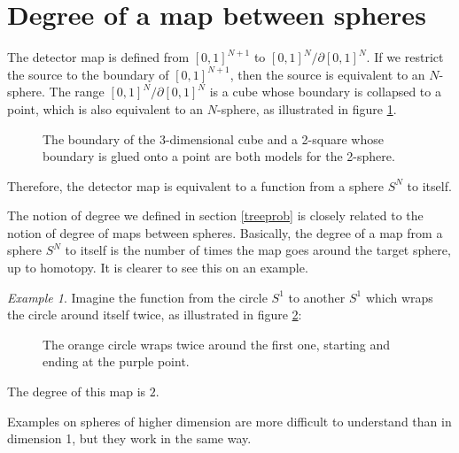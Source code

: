 \documentclass[12pt]{amsart}
\theoremstyle{plain}
\theoremstyle{definition}
\theoremstyle{remark}
\newtheorem{exemple}[teo]{Example}
\begin{document}
\section{Degree of a map between spheres}
The detector map is defined from $[0,1]^{N+1}$ to $[0,1]^N/\partial [0,1]^N$.
If we restrict the source to the boundary of $[0,1]^{N+1}$, then the source is equivalent to an $N$-sphere.
The range $[0,1]^N/\partial [0,1]^N$ is a cube whose boundary is collapsed to a point, 
which is also equivalent to an $N$-sphere, as illustrated in figure \ref{sphere}.
\begin{figure}
  \def\svgwidth{0.4\hsize}
  
  \caption{The boundary of the 3-dimensional cube and a 2-square whose boundary is glued onto a point 
  are both models for the 2-sphere.}
  \label{sphere}
\end{figure}
Therefore, the detector map is equivalent to a function from a sphere $S^N$ to itself.

The notion of degree we defined in section \ref{treeprob} is closely related 
to the notion of degree of maps between spheres.
Basically, the degree of a map from a sphere $S^N$ to itself is the number of times 
the map goes around the target sphere, up to homotopy.
It is clearer to see this on an example.
\begin{exemple}
  Imagine the function from the circle $S^1$ to another $S^1$ which wraps the circle around itself twice,
  as illustrated in figure \ref{degre2}:
  \begin{figure}
    \def\svgwidth{0.4\hsize}
    
    \caption{The orange circle wraps twice around the first one, starting and ending at the purple point.}
    \label{degre2}
  \end{figure}
  The degree of this map is $2$.
\end{exemple}
Examples on spheres of higher dimension are more difficult to understand than in dimension 1, but they work in the same way.
\end{document}
